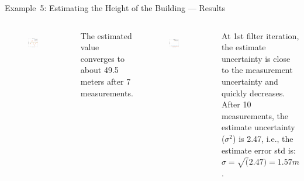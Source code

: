 \begin{frame}{Example~5: Estimating the Height of the Building --- Results}
\begin{columns}
\vspace{-10pt}
    \begin{figure}
	   \centering
	   \includegraphics[width=0.6\textwidth]{Figures/Chapter1/ex5_FirstKalmanFilter_H_Estimate.eps}
	   \label{fig:ex5_FirstKalmanFilter_H_Estimate}
	   \vspace{-10pt}
	\end{figure}
	The estimated value converges to about 49.5 meters after 7 measurements.
	
	\begin{figure}
	   \centering
	   \includegraphics[width=0.6\textwidth]{Figures/Chapter1/ex5_FirstKalmanFilter_Estimate_Uncertainties.eps}
	   \label{fig:ex5_FirstKalmanFilter_Estimate_Uncertainties}
	   \vspace{-10pt}
	\end{figure}
	At 1st filter iteration, the estimate uncertainty is close to the measurement uncertainty and quickly decreases. After 10 measurements, the estimate uncertainty ($\sigma^2$) is 2.47, i.e., the estimate error std is: $\sigma =\sqrt(2.47)=1.57m$.
    

\end{columns}
\end{frame}
